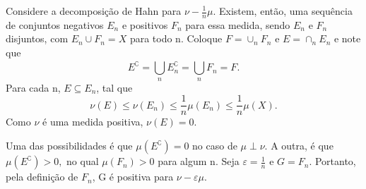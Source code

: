 \documentclass[measure_theory.tex]{subfiles}
\begin{document}
\begin{proof*}
	Considere a decomposição de Hahn para \(\nu -\frac{1}{n}\mu .\) Existem, então, uma sequência de conjuntos negativos \(E_{n}\) e positivos \(F_{n}\) para essa medida, sendo \(E_{n}\) e \(F_{n}\) disjuntos, com \(E_{n}\cup F_{n} = X\) para todo n.
	Coloque \(F = \cup _n F_{n}\) e \(E = \cap_{n} E_{n}\) e note que
	\[
		E ^{\complement} = \bigcup_{n}^{}E_{n}^{\complement} = \bigcup_{n}^{}F_{n} = F.
	\]
	Para cada n, \(E\subseteq E_{n}\), tal que
	\[
		\nu (E) \leq \nu (E_{n}) \leq \frac{1}{n}\mu (E_{n})\leq \frac{1}{n}\mu (X).
	\]
	Como \(\nu \) é uma medida positiva, \(\nu (E) = 0.\)

	Uma das possibilidades é que \(\mu (E ^{\complement}) = 0\) no caso de \(\mu \perp \nu \). A outra, é que \(\mu (E ^{\complement})>0,\) no qual \(\mu (F_{n}) > 0\) para algum n. Seja \(\varepsilon  = \frac{1}{n}\) e \(G = F_{n}.\) Portanto,
	pela definição de \(F_{n}\), G é positiva para \(\nu - \varepsilon \mu .\) \qedsymbol
\end{proof*}
\end{document}

